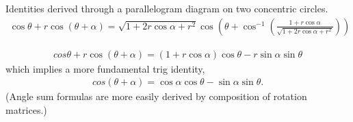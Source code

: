 \documentclass{article}
\begin{document}
Identities derived through a parallelogram diagram on two concentric circles.
\begin{align*}
    \cos\theta + r\cos(\theta + \alpha) = \sqrt{1 + 2r\cos\alpha + r^2} \cos\left(\theta + \cos^{-1}\left(\frac{1+r\cos\alpha}{\sqrt{1+2r\cos\alpha + r^2}}\right)\right)
\end{align*}

\begin{align*}
    cos\theta + r\cos(\theta + \alpha) = \left(1 + r\cos\alpha\right)\cos\theta - r\sin\alpha\sin\theta
\end{align*}
which implies a more fundamental trig identity,
\begin{align*}
    cos\left(\theta + \alpha\right) = \cos\alpha\cos\theta - \sin\alpha \sin\theta.
\end{align*}
(Angle sum formulas are more easily derived by composition of rotation matrices.)
\end{document}
